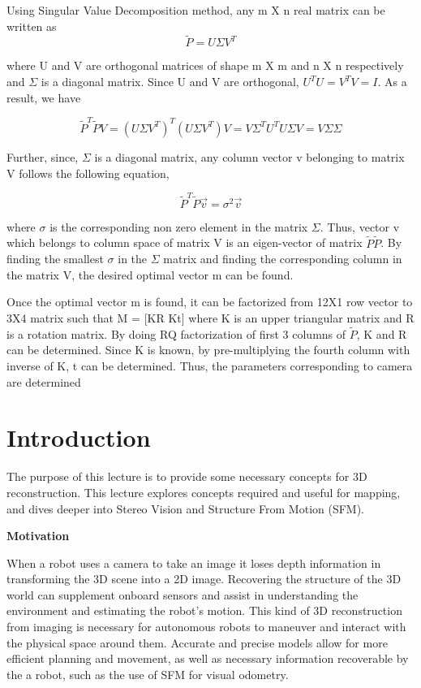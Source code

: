 \documentclass[twoside]{article}
\begin{document}
Using Singular Value Decomposition method, any m X n real matrix can be written as 
\begin{equation} \label{eqno:9}
\tilde{P} = U \Sigma V^T \end{equation}

where U and V are orthogonal matrices of shape m X m and n X n respectively and $\Sigma $ is a diagonal matrix. Since U and V are orthogonal, $U^TU = V^TV = I$.  As a result, we have

\begin{equation} \label{eqno:10}
\tilde{P}^T \tilde{P} V = (U \Sigma V^T)^T (U \Sigma V^T) V = V \Sigma^T U^T U \Sigma V = V \Sigma \Sigma  \end{equation}

Further, since,  $\Sigma$ is a diagonal matrix, any column vector v belonging to matrix V follows the following equation,

\begin{equation} \label{eqno:10}
\tilde{P}^T \tilde{P} \vec{v} = \sigma^2 \vec{v}  \end{equation}

where $\sigma$ is the corresponding non zero element in the matrix $\Sigma$. Thus, vector v which belongs to column space of matrix V is an eigen-vector of matrix $\tilde{P}\tilde{P}$. By finding the smallest $\sigma$ in the $\Sigma$ matrix and finding the corresponding column in the matrix V, the desired optimal vector m can be found.

Once the optimal vector m is found, it can be factorized from 12X1 row vector to 3X4 matrix such that M = [KR Kt] where K is an upper triangular matrix and R is a rotation matrix. By doing RQ factorization of first 3 columns of $\tilde{P}$, K and R can be determined. Since K is known, by pre-multiplying the fourth column with inverse of K, t can be determined. Thus, the parameters corresponding to camera are determined

\section{Introduction}
The purpose of this lecture is to provide some necessary concepts for 3D reconstruction. This lecture explores concepts required and useful for mapping, and dives deeper into Stereo Vision and Structure From Motion (SFM).	


	\textbf{Motivation}
	
	When a robot uses a camera to take an image it loses depth information in transforming the 3D scene into a 2D image.  
	Recovering the structure of the 3D world can supplement onboard sensors and assist in understanding the environment and estimating the robot's motion.
	This kind of 3D reconstruction from imaging is necessary for autonomous robots to maneuver and interact with the physical space around them. Accurate and precise models allow for more efficient planning and movement, as well as necessary information recoverable by the a robot, such as the use of SFM for visual odometry.
	
\end{document}
